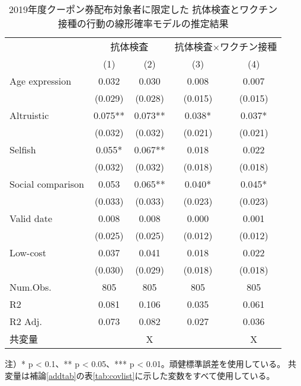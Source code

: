 \documentclass[
  11pt,
  a4paper,
]{article}
\begin{document}
\begin{table}

\caption{\label{tab:show-act-coupon1-reg}2019年度クーポン券配布対象者に限定した 抗体検査とワクチン接種の行動の線形確率モデルの推定結果}
\centering
\begin{threeparttable}
\begin{tabular}[t]{lcccc}
\toprule
\multicolumn{1}{c}{ } & \multicolumn{2}{c}{抗体検査} & \multicolumn{2}{c}{抗体検査×ワクチン接種} \\
\cmidrule(l{3pt}r{3pt}){2-3} \cmidrule(l{3pt}r{3pt}){4-5}
  & (1) & (2) & (3) & (4)\\
\midrule
Age expression & 0.032 & 0.030 & 0.008 & 0.007\\
 & (0.029) & (0.028) & (0.015) & (0.015)\\
Altruistic & 0.075** & 0.073** & 0.038* & 0.037*\\
 & (0.032) & (0.032) & (0.021) & (0.021)\\
Selfish & 0.055* & 0.067** & 0.018 & 0.022\\
 & (0.032) & (0.032) & (0.018) & (0.018)\\
Social comparison & 0.053 & 0.065** & 0.040* & 0.045*\\
 & (0.033) & (0.033) & (0.023) & (0.023)\\
Valid date & 0.008 & 0.008 & 0.000 & 0.001\\
 & (0.025) & (0.025) & (0.012) & (0.012)\\
Low-cost & 0.037 & 0.041 & 0.018 & 0.022\\
 & (0.030) & (0.029) & (0.018) & (0.018)\\
\midrule
Num.Obs. & 805 & 805 & 805 & 805\\
R2 & 0.081 & 0.106 & 0.035 & 0.061\\
R2 Adj. & 0.073 & 0.082 & 0.027 & 0.036\\
共変量 &  & X &  & X\\
\bottomrule
\end{tabular}
\begin{tablenotes}
\item 注）* p < 0.1、** p < 0.05、*** p < 0.01。頑健標準誤差を使用している。 共変量は補論\ref{addtab}の表\ref{tab:covlist}に示した変数をすべて使用している。
\end{tablenotes}
\end{threeparttable}
\end{table}
\end{document}
